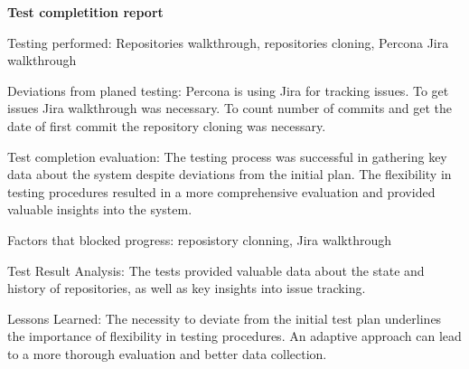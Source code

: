 
\textbf{Test completition report}

Testing performed: Repositories walkthrough, repositories cloning, Percona Jira walkthrough

Deviations from planed testing: Percona is using Jira for tracking issues. To get issues Jira walkthrough was necessary. To count number of commits and get the date of first commit the repository cloning was necessary.

Test completion evaluation: The testing process was successful in gathering key data about the system despite deviations from the initial plan. The flexibility in testing procedures resulted in a more comprehensive evaluation and provided valuable insights into the system.

Factors that blocked progress: reposistory clonning, Jira walkthrough

Test Result Analysis: The tests provided valuable data about the state and history of repositories, as well as key insights into issue tracking.

Lessons Learned: The necessity to deviate from the initial test plan underlines the importance of flexibility in testing procedures. An adaptive approach can lead to a more thorough evaluation and better data collection.


